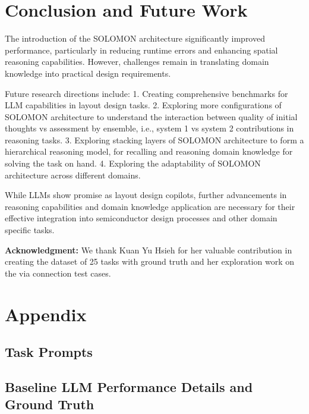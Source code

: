 \documentclass{article}
\begin{document}
\section{Conclusion and Future Work}
The introduction of the SOLOMON architecture significantly improved performance, particularly in reducing runtime errors and enhancing spatial reasoning capabilities. However, challenges remain in translating domain knowledge into practical design requirements.

Future research directions include:
1. Creating comprehensive benchmarks for LLM capabilities in layout design tasks.
2. Exploring more configurations of SOLOMON architecture to understand the interaction between quality of initial thoughts vs assessment by ensemble, i.e., system 1 vs system 2 contributions in reasoning tasks.
3. Exploring stacking layers of SOLOMON architecture to form a hierarchical reasoning model, for recalling and reasoning domain knowledge for solving the task on hand.
4. Exploring the adaptability of SOLOMON architecture across different domains.

While LLMs show promise as layout design copilots, further advancements in reasoning capabilities and domain knowledge application are necessary for their effective integration into semiconductor design processes and other domain specific tasks.

\textbf{Acknowledgment:} We thank Kuan Yu Hsieh for her valuable contribution in creating the dataset of 25 tasks with ground truth and her exploration work on the via connection test cases.

\printbibliography %

\newpage
\appendix

\section{Appendix}
\subsection{Task Prompts}
\label{appendix:task_prompts}


\subsection{Baseline LLM Performance Details and Ground Truth}
\label{appendix:baseline_performance}
\end{document}
